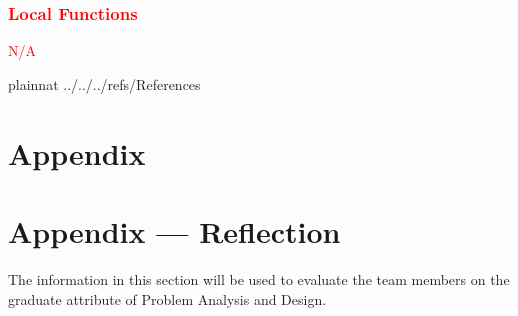 \documentclass[12pt, titlepage]{article}
\begin{document}
\subsubsection{\textcolor{red}{Local Functions}}
\textcolor{red}{N/A}


\newpage

 {plainnat}
 {../../../refs/References}

\newpage

\section{Appendix} \label{Appendix}


\newpage{}

\section*{Appendix --- Reflection}


The information in this section will be used to evaluate the team members on the
graduate attribute of Problem Analysis and Design.


\end{document}
